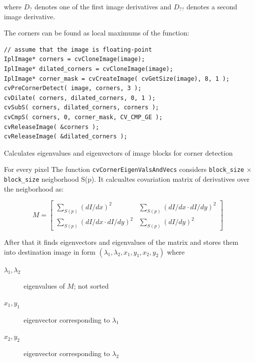 where $D_?$ denotes one of the first image derivatives and $D_{??}$ denotes a second image derivative.

The corners can be found as local maximums of the function:

\begin{lstlisting}
// assume that the image is floating-point
IplImage* corners = cvCloneImage(image);
IplImage* dilated_corners = cvCloneImage(image);
IplImage* corner_mask = cvCreateImage( cvGetSize(image), 8, 1 );
cvPreCornerDetect( image, corners, 3 );
cvDilate( corners, dilated_corners, 0, 1 );
cvSubS( corners, dilated_corners, corners );
cvCmpS( corners, 0, corner_mask, CV_CMP_GE );
cvReleaseImage( &corners );
cvReleaseImage( &dilated_corners );
\end{lstlisting}

\label{CornerEigenValsAndVecs}
Calculates eigenvalues and eigenvectors of image blocks for corner detection


\begin{description}
\end{description}

For every pixel The function \texttt{cvCornerEigenValsAndVecs} considers \texttt{block\_size} $\times$ \texttt{block\_size} neigborhood S(p). It calcualtes covariation matrix of derivatives over the neigborhood as:

\[
M = \begin{bmatrix}
\sum_{S(p)}(dI/dx)^2 & \sum_{S(p)}(dI/dx \cdot dI/dy)^2 \\
\sum_{S(p)}(dI/dx \cdot dI/dy)^2 & \sum_{S(p)}(dI/dy)^2
\end{bmatrix}
\]

After that it finds eigenvectors and eigenvalues of the matrix and stores them into destination image in form
$(\lambda_1, \lambda_2, x_1, y_1, x_2, y_2)$ where
\begin{description}
\item[$\lambda_1, \lambda_2$]eigenvalues of $M$; not sorted
\item[$x_1, y_1$]eigenvector corresponding to $\lambda_1$
\item[$x_2, y_2$]eigenvector corresponding to $\lambda_2$
\end{description}

